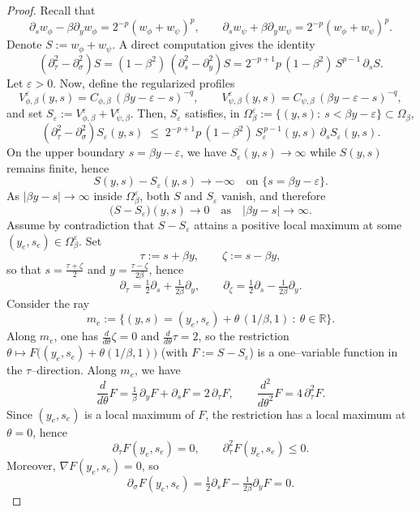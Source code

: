 \documentclass[
  sn-mathphys-num,
  colorlinks,
  linkcolor=darkmagenta,
  citecolor=rufous,
  urlcolor=zaffre,
  hypertexnames=false
]{sn-jnl}
\numberwithin{equation}{section}
\begin{document}
\begin{proof}
Recall that
$$
\partial_s w_\phi - \beta \partial_y w_\phi = 2^{-p}(w_\phi+w_\psi)^p,\qquad
\partial_s w_\psi + \beta \partial_y w_\psi = 2^{-p}(w_\phi+w_\psi)^p.
$$
Denote $S:=w_\phi+w_\psi$. A direct computation gives the identity
\begin{equation}\label{eq:tau-sigma-identity}
(\partial_\tau^2-\partial_\sigma^2)S
= (1-\beta^2)\,(\partial_s^2-\partial_y^2)S
= 2^{-p+1}p\,(1-\beta^2)\,S^{p-1}\,\partial_s S.
\end{equation}
Let $\varepsilon>0$. Now, define the regularized profiles
$$
V_{\phi,\beta}^\varepsilon(y,s)=C_{\phi,\beta}\,(\beta y-\varepsilon-s)^{-q},\qquad
V_{\psi,\beta}^\varepsilon(y,s)=C_{\psi,\beta}\,(\beta y-\varepsilon-s)^{-q},
$$
and set $S_\varepsilon:=V_{\phi,\beta}^\varepsilon+V_{\psi,\beta}^\varepsilon$. Then, $S_\varepsilon$ satisfies, in $\Omega_\beta^\varepsilon:=\{(y,s):\ s<\beta y-\varepsilon\}\subset\Omega_\beta$,
\begin{equation}\label{sub}
(\partial_\tau^2-\partial_\sigma^2)S_\varepsilon(y,s)
\;\le\;
2^{-p+1}p\,(1-\beta^2)\,S_\varepsilon^{\,p-1}(y,s)\,\partial_s S_\varepsilon(y,s).
\end{equation}
On the upper boundary $s=\beta y-\varepsilon$, we have $S_\varepsilon(y,s)\to \infty$ while $S(y,s)$ remains finite, hence
$$
S(y,s)-S_\varepsilon(y,s)\to-\infty\quad\text{on } \{s=\beta y-\varepsilon\}.
$$
As $|\beta y - s|\to\infty$ inside $\Omega_\beta^\varepsilon$, both $S$ and $S_\varepsilon$ vanish, and therefore
$$
\big(S-S_\varepsilon\big)(y,s)\to 0 \quad \text{as} \quad |\beta y - s|\to\infty.
$$
Assume by contradiction that $S-S_\varepsilon$ attains a positive local maximum at some $(y_e,s_e)\in\Omega_\beta^\varepsilon$.
Set
$$
\tau:=s+\beta y,\qquad \zeta:=s-\beta y,
$$
so that $s=\tfrac{\tau+\zeta}{2}$ and $y=\tfrac{\tau-\zeta}{2\beta}$, hence
$$
\partial_\tau=\tfrac12\partial_s+\tfrac{1}{2\beta}\partial_y,\qquad
\partial_\zeta=\tfrac12\partial_s-\tfrac{1}{2\beta}\partial_y.
$$
Consider the ray
$$
m_e:=\{(y,s)=(y_e,s_e)+\theta\,(1/\beta,1)\ :\ \theta\in\mathbb{R}\}.
$$
Along $m_e$, one has $\frac{d}{d\theta}\zeta=0$ and $\frac{d}{d\theta}\tau=2$, so the restriction
$\theta\mapsto F\big((y_e,s_e)+\theta(1/\beta,1)\big)$ (with $F:=S-S_\varepsilon$) is a one–variable function in the $\tau$–direction.
Along $m_e$, we have
$$
\frac{d}{d\theta}F=\tfrac1\beta\,\partial_y F+\partial_s F=2\,\partial_\tau F,\qquad
\frac{d^2}{d\theta^2}F=4\,\partial_\tau^2 F.
$$
Since $(y_e,s_e)$ is a local maximum of $F$, the restriction has a local maximum at $\theta=0$, hence
$$
\partial_\tau F(y_e,s_e)=0,\qquad \partial_\tau^2 F(y_e,s_e)\le 0.
$$
Moreover, $\nabla F(y_e,s_e)=0$, so
$$
\partial_\sigma F(y_e,s_e)=\tfrac12\partial_sF-\tfrac{1}{2\beta}\partial_yF=0.
$$


\end{proof}
\end{document}
